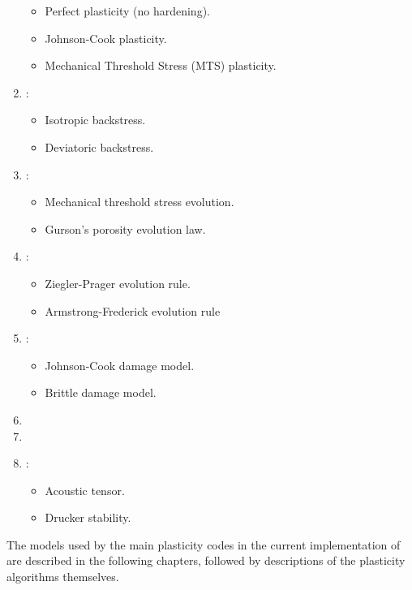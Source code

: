 \begin{enumerate}
\begin{itemize}
        \item Perfect plasticity (no hardening).
        \item Johnson-Cook plasticity.
        \item Mechanical Threshold Stress (MTS) plasticity.
      \end{itemize}
    \item {}:
      \begin{itemize}
        \item Isotropic backstress.
        \item Deviatoric backstress.
      \end{itemize}
    \item {}:
      \begin{itemize}
        \item Mechanical threshold stress evolution.
        \item Gurson's porosity evolution law. 
      \end{itemize}
    \item {}:
      \begin{itemize}
        \item Ziegler-Prager evolution rule.
        \item Armstrong-Frederick evolution rule
      \end{itemize}
    \item {}:
      \begin{itemize}
        \item Johnson-Cook damage model.
        \item Brittle damage model.
      \end{itemize}
    \item {}
    \item {}
    \item {}:
      \begin{itemize}
        \item Acoustic tensor.
        \item Drucker stability.
      \end{itemize}
\end{enumerate}
  
The models used by the main plasticity codes in the current implementation 
of \Vaango are described in the following chapters, followed by 
descriptions of the plasticity algorithms themselves.

